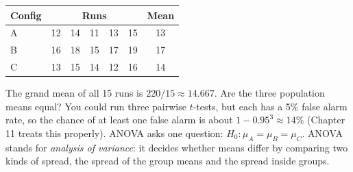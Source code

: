 \begin{center}
\begin{tabular}{lccccc|c}
\toprule
Config & \multicolumn{5}{c|}{Runs} & Mean \\
\midrule
A & 12 & 14 & 11 & 13 & 15 & 13 \\
B & 16 & 18 & 15 & 17 & 19 & 17 \\
C & 13 & 15 & 14 & 12 & 16 & 14 \\
\bottomrule
\end{tabular}
\end{center}

The grand mean of all 15 runs is $220/15 \approx 14.667$. Are the three
population means equal? You could run three pairwise $t$-tests, but each has a
5\% false alarm rate, so the chance of at least one false alarm is about
$1 - 0.95^3 \approx 14\%$ (Chapter 11 treats this properly). ANOVA asks
one question: $H_0\colon \mu_A = \mu_B = \mu_C$. ANOVA stands for
\emph{analysis of variance}: it decides whether means differ by comparing two
kinds of spread, the spread of the group means and the spread inside groups.

